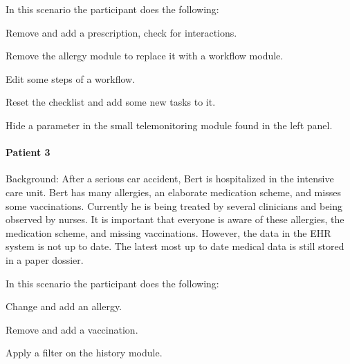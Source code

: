     In this scenario the participant does the following:
    \vspace{-6pt}
    \begin{myenumerate}
        \item Remove and add a prescription, check for interactions.
        \item Remove the allergy module to replace it with a workflow module.
        \item Edit some steps of a workflow.
        \item Reset the checklist and add some new tasks to it.
        \item Hide a parameter in the small telemonitoring module found in the left panel.
    \end{myenumerate}

    \paragraph{Patient 3} Background: After a serious car accident, Bert is hospitalized in the intensive care unit. Bert has many allergies, an elaborate medication scheme, and misses some vaccinations. Currently he is being treated by several clinicians and being observed by nurses. It is important that everyone is aware of these allergies, the medication scheme, and missing vaccinations. However, the data in the EHR system is not up to date. The latest most up to date medical data is still stored in a paper dossier.

    In this scenario the participant does the following:
    \vspace{-6pt}
    \begin{myenumerate}
        \item Change and add an allergy.
        \item Remove and add a vaccination.
        \item Apply a filter on the history module.
    \end{myenumerate}